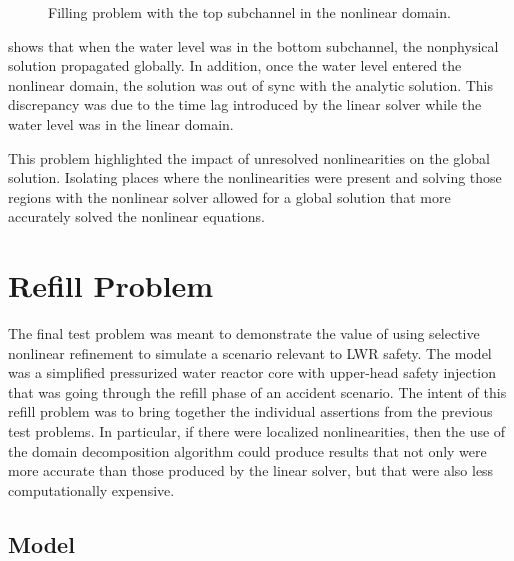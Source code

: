 \begin{figure}[h!tb]
\centering

\caption{Filling problem with the top subchannel in the nonlinear domain.}
\label{fig:vmpDDTopChan}
\end{figure}

 shows that when the water level was in the bottom subchannel, the nonphysical solution propagated globally.
In addition, once the water level entered the nonlinear domain, the solution was out of sync with the analytic solution.
This discrepancy was due to the time lag introduced by the linear solver while the water level was in the linear domain.

This problem highlighted the impact of unresolved nonlinearities on the global solution.
Isolating places where the nonlinearities were present and solving those regions with the nonlinear solver allowed for a global solution that more accurately solved the nonlinear equations.

\FloatBarrier
\section{Refill Problem}
\label{sect:refillProblem}

The final test problem was meant to demonstrate the value of using selective nonlinear refinement to simulate a scenario relevant to LWR safety.
The model was a simplified pressurized water reactor core with upper-head safety injection that was going through the refill phase of an accident scenario.
The intent of this refill problem was to bring together the individual assertions from the previous test problems.
In particular, if there were localized nonlinearities, then the use of the domain decomposition algorithm could produce results that not only were more accurate than those produced by the linear solver, but that were also less computationally expensive.

\subsection{Model}
\label{sect:refillModel}

